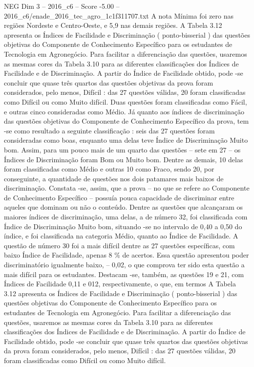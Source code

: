 \begin{textsample}{NEG Dim 3 – 2016\_c6 – Score -5.00 – 2016\_c6/enade\_2016\_tec\_agro\_1c1f311707.txt}
A nota Mínima foi zero nas regiões Nordeste e Centro-Oeste, e 5,9 nas demais regiões.
A Tabela 3.12 apresenta os Índices de Facilidade e Discriminação ( ponto-bisserial ) das questões objetivas do Componente de Conhecimento Específico para os estudantes de Tecnologia em Agronegócio.
Para facilitar a diferenciação das questões, usaremos as mesmas cores da Tabela 3.10 para as diferentes classificações dos Índices de Facilidade e de Discriminação.
A partir do Índice de Facilidade obtido, pode -se concluir que quase três quartos das questões objetivas da prova foram considerados, pelo menos, Difícil : das 27 questões válidas, 20 foram classificadas como Difícil ou como Muito difícil.
Duas questões foram classificadas como Fácil, e outras cinco consideradas como Médio.
Já quanto aos índices de discriminação das questões objetivas do Componente de Conhecimento Específico da prova, tem -se como resultado a seguinte classificação : seis das 27 questões foram consideradas como boas, enquanto uma delas teve Índice de Discriminação Muito bom.
Assim, para um pouco mais de um quarto das questões – sete em 27 – os Índices de Discriminação foram Bom ou Muito bom.
Dentre as demais, 10 delas foram classificadas como Médio e outras 10 como Fraco, sendo 20, por conseguinte, a quantidade de questões nos dois patamares mais baixos de discriminação.
Constata -se, assim, que a prova – no que se refere ao Componente de Conhecimento Específico – possuía pouca capacidade de discriminar entre aqueles que dominam ou não o conteúdo.
Dentre as questões que alcançaram os maiores índices de discriminação, uma delas, a de número 32, foi classificada com Índice de Discriminação Muito bom, situando -se no intervalo de 0,40 a 0,50 do índice, e foi classificada na categoria Médio, quanto ao Índice de Facilidade.
A questão de número 30 foi a mais difícil dentre as 27 questões específicas, com baixo Índice de Facilidade, apenas 8 \% de acertos.
Essa questão apresentou poder discriminatório igualmente baixo, – 0,02, o que comprova ter sido esta questão a mais difícil para os estudantes.
Destacam -se, também, as questões 19 e 21, com Índices de Facilidade 0,11 e 012, respectivamente, o que, em termos A Tabela 3.12 apresenta os Índices de Facilidade e Discriminação ( ponto-bisserial ) das questões objetivas do Componente de Conhecimento Específico para os estudantes de Tecnologia em Agronegócio.
Para facilitar a diferenciação das questões, usaremos as mesmas cores da Tabela 3.10 para as diferentes classificações dos Índices de Facilidade e de Discriminação.
A partir do Índice de Facilidade obtido, pode -se concluir que quase três quartos das questões objetivas da prova foram considerados, pelo menos, Difícil : das 27 questões válidas, 20 foram classificadas como Difícil ou como Muito difícil.

\end{textsample}
